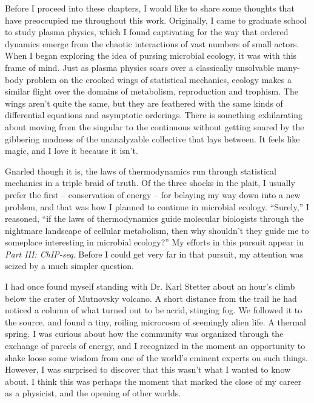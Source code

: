 Before I proceed into these chapters, I would like to share some thoughts that have preoccupied me throughout this work. Originally, I came to graduate school to study plasma physics, which I found captivating for the way that ordered dynamics emerge from the chaotic interactions of vast numbers of small actors. When I began exploring the idea of pursing microbial ecology, it was with this frame of mind. Just as plasma physics soars over a classically unsolvable many-body problem on the crooked wings of statistical mechanics, ecology makes a similar flight over the domains of metabolism, reproduction and trophism. The wings aren't quite the same, but they are feathered with the same kinds of differential equations and asymptotic orderings. There is something exhilarating about moving from the singular to the continuous without getting snared by the gibbering madness of the unanalyzable collective that lays between. It feels like magic, and I love it because it isn't.

Gnarled though it is, the laws of thermodynamics run through statistical mechanics in a triple braid of truth. Of the three shocks in the plait, I usually prefer the first -- conservation of energy -- for belaying my way down into a new problem, and that was how I planned to continue in microbial ecology. ``Surely,'' I reasoned, ``if the laws of thermodynamics guide molecular biologists through the nightmare landscape of cellular metabolism, then why shouldn't they guide me to someplace interesting in microbial ecology?'' My efforts in this pursuit appear in {\em Part III: ChIP-seq}. Before I could get very far in that pursuit, my attention was seized by a much simpler question.

I had once found myself standing with Dr. Karl Stetter about an hour's climb below the crater of Mutnovsky volcano. A short distance from the trail he had noticed a column of what turned out to be acrid, stinging fog. We followed it to the source, and found a tiny, roiling microcosm of seemingly alien life. A thermal spring. I was curious about how the community was organized through the exchange of parcels of energy, and I recognized in the moment an opportunity to shake loose some wisdom from one of the world's eminent experts on such things. However, I was surprised to discover that this wasn't what I wanted to know about. I think this was perhaps the moment that marked the close of my career as a physicist, and the opening of other worlds.


